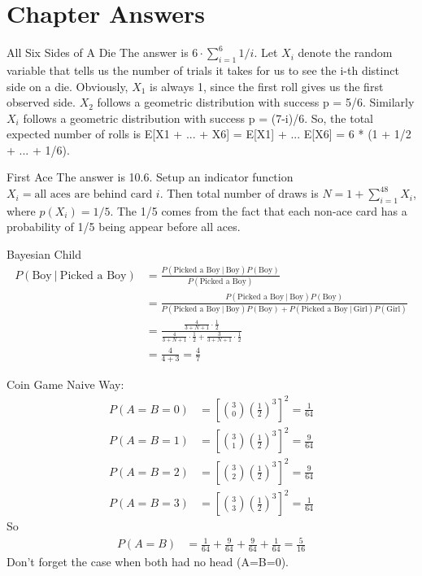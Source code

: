 \documentclass[oldfontcommands]{memoir}
\begin{document}
{\newpage\section{Chapter Answers}\begin{answer}{All Six Sides of A Die}
The answer is $6 \cdot \sum_{i=1}^6 1/i$. Let $X_i$ denote the random variable that tells us the number of trials it takes for us to see the i-th distinct side on a die. Obviously, $X_1$ is always 1, since the first roll gives us the first observed side. $X_2$ follows a geometric distribution with success p = 5/6. Similarly $X_i$ follows a geometric distribution with success p = (7-i)/6. So, the total expected number of rolls is E[X1 + ... + X6] = E[X1] + ... E[X6] = 6 * (1 + 1/2 + ... + 1/6).\end{answer}
\begin{answer}{First Ace}
The answer is 10.6. Setup an indicator function $X_i = \mbox{all aces are behind card } i$. Then total number of draws is $N = 1 + \sum_{i=1}^48 X_i$, where $p(X_i) = 1/5$. The 1/5 comes from the fact that each non-ace card has a probability of 1/5 being appear before all aces.\end{answer}
\begin{answer}{Bayesian Child}
\begin{align}
	P(\text{Boy} ~|~ \text{Picked a Boy}) &= \frac{P(\text{Picked a Boy} ~|~ \text{Boy})P(\text{Boy})}{P(\text{Picked a Boy})}\\
	 &= \frac{P(\text{Picked a Boy} ~|~ \text{Boy})P(\text{Boy})}{P(\text{Picked a Boy} ~|~ \text{Boy})P(\text{Boy}) + P(\text{Picked a Boy} ~|~ \text{Girl})P(\text{Girl})}\\
	 &= \frac{\frac{4}{3+N+1} \cdot \frac{1}{2}}{\frac{4}{3+N+1} \cdot \frac{1}{2} + \frac{3}{3+N+1} \cdot \frac{1}{2}}\\
	 &= \frac{4}{4+3} = \frac{4}{7}
\end{align}\end{answer}
\begin{answer}{Coin Game}
Naive Way:
\begin{align}
	P(A=B=0) &= \left[\binom{3}{0} \left(\frac{1}{2}\right)^3\right]^2 = \frac{1}{64}\\
	P(A=B=1) &= \left[\binom{3}{1} \left(\frac{1}{2}\right)^3\right]^2 = \frac{9}{64}\\
	P(A=B=2) &= \left[\binom{3}{2} \left(\frac{1}{2}\right)^3\right]^2 = \frac{9}{64}\\
	P(A=B=3) &= \left[\binom{3}{3} \left(\frac{1}{2}\right)^3\right]^2 = \frac{1}{64}	
\end{align}
So
\begin{align}
	P(A=B) &= \frac{1}{64} + \frac{9}{64} + \frac{9}{64} + \frac{1}{64} = \frac{5}{16}
\end{align}
Don't forget the case when both had no head (A=B=0).


\end{answer}}
\end{document}
